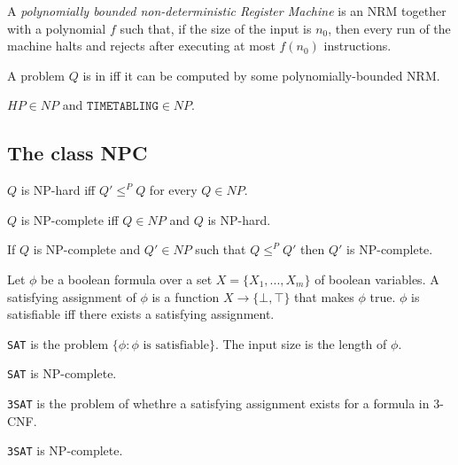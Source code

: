 \documentclass{article}
\begin{document}
\begin{definition*}
	A \emph{polynomially bounded non-deterministic Register Machine} is an NRM together with a polynomial
	$f$ such that, if the size of the input is $n_0$, then every run of the machine halts and
	rejects after executing at most $f(n_0)$ instructions.

	A problem $Q$ is in \nptime iff it can be computed by some polynomially-bounded NRM.
\end{definition*}

\begin{theorem*}[Notes II.12]
	$HP\in NP$ and $\texttt{TIMETABLING}\in NP$.
\end{theorem*}

\subsection{The class NPC}

\begin{definition*}
	$Q$ is NP-hard iff $Q'\leq^P Q$ for every $Q\in NP$.

	$Q$ is NP-complete iff $Q\in NP$ and $Q$ is NP-hard.
\end{definition*}

\begin{theorem*}[II.15]
	If $Q$ is NP-complete and $Q'\in NP$ such that $Q\leq^P Q'$
	then $Q'$ is NP-complete.
\end{theorem*}

\begin{definition*}[SAT]
	Let $\phi$ be a boolean formula over a set $X=\{X_1, ..., X_m\}$ of 
	boolean variables. A satisfying assignment of $\phi$ is a function
	$X\to\{\bot,\top\}$ that makes $\phi$ true. $\phi$ is satisfiable iff
	there exists a satisfying assignment.

	\texttt{SAT} is the problem $\{\phi : \phi \text{ is satisfiable}\}$.
	The input size is the length of $\phi$.	
\end{definition*}

\begin{theorem*}
	\texttt{SAT} is NP-complete.	
\end{theorem*}

\begin{definition*}[3SAT]
	\texttt{3SAT} is the problem of whethre a satisfying assignment exists for a 
	formula in 3-CNF.	
\end{definition*}

\begin{theorem*}[II.20]
	\texttt{3SAT} is NP-complete.	
\end{theorem*}
\end{document}
